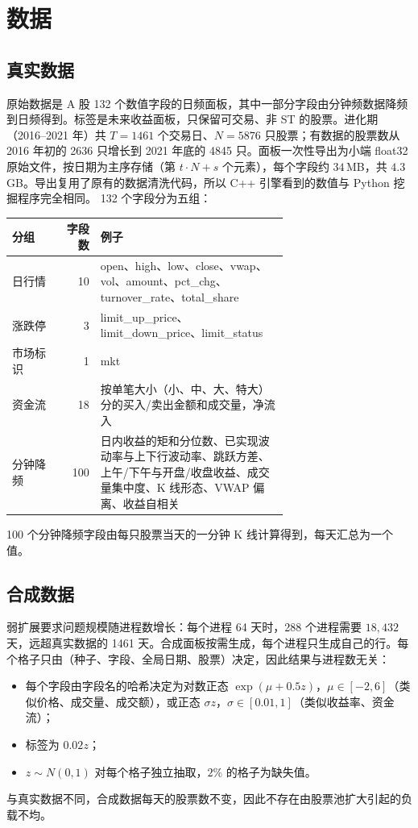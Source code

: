 \documentclass[11pt,a4paper,UTF8,fontset=fandol]{ctexart}
\begin{document}
\section{数据}

\subsection{真实数据}
原始数据是 A 股 132 个数值字段的日频面板，其中一部分字段由分钟频数据降频到日频得到。标签是未来收益面板，只保留可交易、非 ST 的股票。进化期（2016--2021 年）共 $T=1461$ 个交易日、$N=5876$ 只股票；有数据的股票数从 2016 年初的 2636 只增长到 2021 年底的 4845 只。面板一次性导出为小端 float32 原始文件，按日期为主序存储（第 $t\cdot N+s$ 个元素），每个字段约 $34$\,MB，共 $4.3$\,GB。导出复用了原有的数据清洗代码，所以 C++ 引擎看到的数值与 Python 挖掘程序完全相同。
132 个字段分为五组：
\begin{center}
\begin{tabular}{lrp{0.68\linewidth}}
\toprule
分组 & 字段数 & 例子 \\
\midrule
日行情 & 10 & open、high、low、close、vwap、vol、amount、pct\_chg、turnover\_rate、total\_share \\
涨跌停 & 3 & limit\_up\_price、limit\_down\_price、limit\_status \\
市场标识 & 1 & mkt \\
资金流 & 18 & 按单笔大小（小、中、大、特大）分的买入/卖出金额和成交量，净流入 \\
分钟降频 & 100 & 日内收益的矩和分位数、已实现波动率与上下行波动率、跳跃方差、上午/下午与开盘/收盘收益、成交量集中度、K 线形态、VWAP 偏离、收益自相关 \\
\bottomrule
\end{tabular}
\end{center}
100 个分钟降频字段由每只股票当天的一分钟 K 线计算得到，每天汇总为一个值。

\subsection{合成数据}
弱扩展要求问题规模随进程数增长：每个进程 64 天时，288 个进程需要 $18{,}432$ 天，远超真实数据的 1461 天。合成面板按需生成，每个进程只生成自己的行。每个格子只由（种子、字段、全局日期、股票）决定，因此结果与进程数无关：
\begin{itemize}[nosep]
  \item 每个字段由字段名的哈希决定为对数正态 $\exp(\mu + 0.5z)$，$\mu\in[-2,6]$（类似价格、成交量、成交额），或正态 $\sigma z$，$\sigma\in[0.01,1]$（类似收益率、资金流）；
  \item 标签为 $0.02z$；
  \item $z\sim N(0,1)$ 对每个格子独立抽取，$2\%$ 的格子为缺失值。
\end{itemize}
与真实数据不同，合成数据每天的股票数不变，因此不存在由股票池扩大引起的负载不均。
\end{document}
